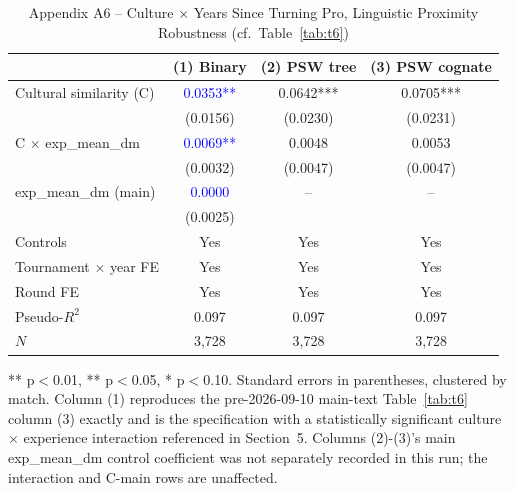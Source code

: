 \documentclass[10pt]{article}
\begin{document}
\begin{table}[htbp]
\centering
\caption{Appendix A6 -- Culture $\times$ Years Since Turning Pro, Linguistic Proximity Robustness (cf.\ Table~\ref{tab:t6}) \label{tab:a6}}
\begin{threeparttable}
\begin{tabular}{lccc}
\toprule
 & (1) Binary & (2) PSW tree & (3) PSW cognate \\
\midrule
Cultural similarity (C)  & \textcolor{blue}{0.0353**} & 0.0642*** & 0.0705*** \\
 & (0.0156) & (0.0230) & (0.0231) \\
C $\times$ exp\_mean\_dm & \textcolor{blue}{0.0069**} & 0.0048 & 0.0053 \\
 & (0.0032) & (0.0047) & (0.0047) \\
exp\_mean\_dm (main) & \textcolor{blue}{0.0000} & \multicolumn{1}{c}{--} & \multicolumn{1}{c}{--} \\
 & (0.0025) & & \\
\midrule
Controls & Yes & Yes & Yes \\
Tournament $\times$ year FE & Yes & Yes & Yes \\
Round FE & Yes & Yes & Yes \\
Pseudo-$R^2$ & 0.097 & 0.097 & 0.097 \\
$N$ & 3,728 & 3,728 & 3,728 \\
\bottomrule
\end{tabular}
\begin{tablenotes}
\small
\item *** p$<$0.01, ** p$<$0.05, * p$<$0.10. Standard errors in parentheses, clustered by match. Column (1) reproduces the pre-2026-09-10 main-text Table~\ref{tab:t6} column (3) exactly and is the specification with a statistically significant culture $\times$ experience interaction referenced in Section~5. Columns (2)-(3)'s main exp\_mean\_dm control coefficient was not separately recorded in this run; the interaction and C-main rows are unaffected.
\end{tablenotes}
\end{threeparttable}
\end{table}
\FloatBarrier
\end{document}
